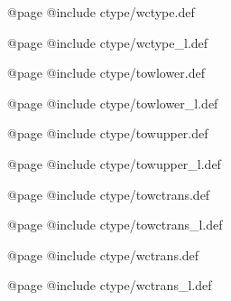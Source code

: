 @page
@include ctype/wctype.def

@page
@include ctype/wctype_l.def

@page
@include ctype/towlower.def

@page
@include ctype/towlower_l.def

@page
@include ctype/towupper.def

@page
@include ctype/towupper_l.def

@page
@include ctype/towctrans.def

@page
@include ctype/towctrans_l.def

@page
@include ctype/wctrans.def

@page
@include ctype/wctrans_l.def

